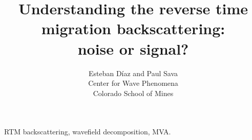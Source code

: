 



\author[E.~D\'{i}az and P.~Sava]{Esteban D\'{i}az and Paul Sava\\ 
Center for Wave Phenomena \\ 
Colorado School of Mines}

\title[Understanding RTM backscattering]{Understanding the reverse time migration backscattering:\\ noise or signal?}
\maketitle

\begin{keywords}
RTM backscattering, wavefield decomposition, MVA.
\end{keywords}









